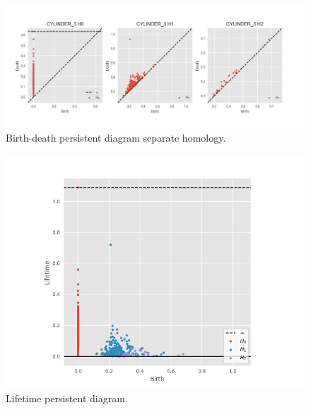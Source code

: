 \documentclass[11pt,a4paper]{report}
\begin{document}
              \begin{figure}[H]
                \centering
                \includegraphics[width=\linewidth]{./ripser/rand_cyclinder_per_homology_seperate.jpg}
                \caption{Birth-death persistent diagram separate homology.}
                \label{fig:sep hom}
              \end{figure}

              \begin{figure}[H]
                \centering
                \includegraphics[width=0.5\linewidth, scale=0.5]{./ripser/rand_cylinder_lifetime.jpg}
                \caption{Lifetime persistent diagram.}
                \label{fig:sep hom}
              \end{figure}







\end{document}
